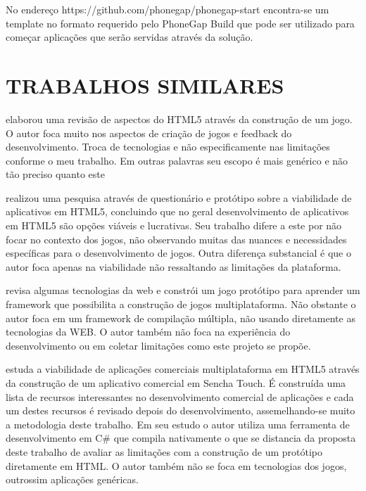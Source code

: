 No endereço https://github.com/phonegap/phonegap-start encontra-se um
template no formato requerido pelo PhoneGap Build que pode ser utilizado
para começar aplicações que serão servidas através da solução.
\section{TRABALHOS SIMILARES}
\cite{crossPlatformMobileGame} elaborou uma revisão de aspectos do
HTML5 através da construção de um jogo. O autor foca muito nos
aspectos de criação de jogos e feedback do desenvolvimento. Troca
de tecnologias e não especificamente nas limitações conforme o meu
trabalho. Em outras palavras seu escopo é mais genérico e não tão
preciso quanto este

\cite{aSeriousContender} realizou uma pesquisa através de questionário
e protótipo sobre a viabilidade de aplicativos em HTML5, concluindo que
no geral desenvolvimento de aplicativos em HTML5 são opções viáveis
e lucrativas. Seu trabalho difere a este por não focar no contexto dos
jogos, não observando muitas das nuances e necessidades específicas
para o desenvolvimento de jogos. Outra diferença substancial é que o
autor foca apenas na viabilidade não ressaltando as limitações da
plataforma.

\cite{crossPlatformMobileGameDevelopment} revisa algumas tecnologias
da web e constrói um jogo protótipo para aprender um framework que
possibilita a construção de jogos multiplataforma. Não obstante
o autor foca em um framework de compilação múltipla, não usando
diretamente as tecnologias da WEB. O autor também não foca na experiência do
desenvolvimento ou em coletar limitações como este projeto se propõe.

\cite{viabilityBusinessApplications} estuda a viabilidade de
aplicações comerciais multiplataforma em HTML5 através da
construção de um aplicativo comercial em Sencha Touch. É construída
uma lista de recursos interessantes no desenvolvimento comercial
de aplicações e cada um destes recursos é revisado depois do
desenvolvimento, assemelhando-se muito a metodologia deste trabalho. Em
seu estudo o autor utiliza uma ferramenta de desenvolvimento em C\# que
compila nativamente o que se distancia da proposta deste trabalho de
avaliar as limitações com a construção de um protótipo diretamente
em HTML. O autor também não se foca em tecnologias dos jogos,
outrossim aplicações genéricas.

